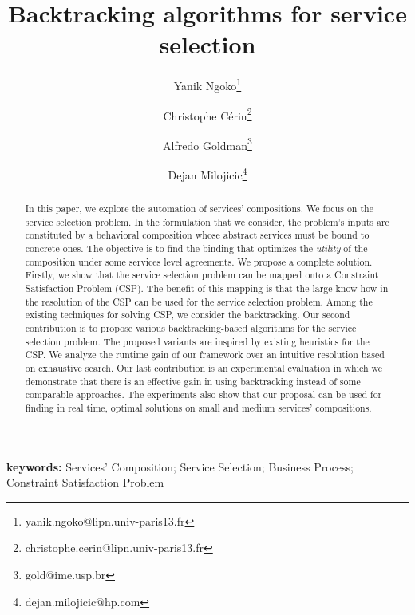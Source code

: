 \documentclass[a4paper]{article}
\begin{document}
\title{Backtracking algorithms for service selection}

\author[1]{Yanik Ngoko\thanks{yanik.ngoko@lipn.univ-paris13.fr}}
\author[1]{Christophe C\'erin\thanks{christophe.cerin@lipn.univ-paris13.fr}}
\author[2]{Alfredo Goldman\thanks{gold@ime.usp.br}}
\author[3]{Dejan Milojicic\thanks{dejan.milojicic@hp.com}}


\date{ }

\maketitle

\begin{abstract}
In this paper, we explore the automation of  services' compositions. We 
focus on the service selection problem. In the formulation that we consider, the problem's 
inputs are constituted by a behavioral composition whose abstract services must be bound to  
concrete ones. The objective is to find the binding that optimizes the {\it utility} 
of the composition under some services level agreements. We propose a complete solution. 
Firstly, we show that the service selection problem can be mapped onto a 
 Constraint Satisfaction Problem (CSP). The benefit of this mapping is that the large know-how 
in the resolution of the CSP can be used for the service selection problem. Among the existing 
techniques for solving CSP, we consider the backtracking. Our second contribution is to propose various 
backtracking-based algorithms for the service selection problem. The proposed variants are inspired by  
existing heuristics for the CSP. We analyze the runtime gain of our framework over an intuitive resolution 
based on exhaustive search. Our last contribution is an experimental evaluation in which we demonstrate 
that there is an effective gain in using  backtracking instead of some comparable approaches. The 
experiments also show that our proposal can be used for finding in real time, optimal solutions on 
small and medium services' compositions.
\end{abstract}

{\bf keywords: } {Services' Composition; Service Selection; Business Process; Constraint Satisfaction Problem}
\end{document}

